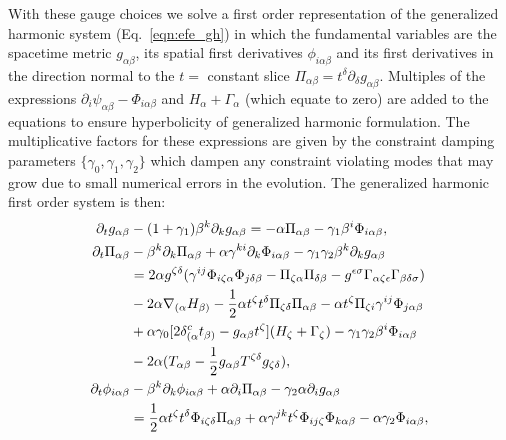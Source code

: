 With these gauge choices we solve a first order representation of the generalized harmonic system (Eq.~\ref{eqn:efe_gh}) in which the fundamental variables are the spacetime metric $ g_{\alpha\beta}$, its spatial first derivatives $\phi_{i\alpha\beta}$ and its first derivatives in the direction normal to the $t=$ constant slice $\Pi_{\alpha\beta} = t^\delta\partial_\delta g_{\alpha\beta}$. Multiples of the expressions $\partial_i\psi_{\alpha\beta} - \Phi_{i\alpha\beta}$ and $H_\alpha + \Gamma_\alpha$ (which equate to zero) are added to the equations to ensure hyperbolicity of generalized harmonic formulation. The multiplicative factors for these expressions are given by the constraint damping parameters $\{\gamma_0,\gamma_1,\gamma_2\}$ which dampen any constraint violating modes that may grow due to small numerical errors in the evolution. The generalized harmonic first order system is then:
%
\begin{align}
  \partial_t g_{\alpha\beta} &- (1 + \gamma_1)\beta^k\partial_k g_{\alpha\beta} = -\alpha\Pi_{\alpha\beta} - \gamma_1\beta^i\Phi_{i\alpha\beta},  \\
  \partial_t\Pi_{\alpha\beta} &- \beta^k\partial_k\Pi_{\alpha\beta} + \alpha \gamma^{ki}\partial_k\Phi_{i\alpha\beta} - \gamma_1\gamma_2\beta^k\partial_k g_{\alpha\beta} \\
  &= 2\alpha g^{\zeta\delta}(\gamma^{ij}\Phi_{i\zeta\alpha}\Phi_{j\delta\beta} - \Pi_{\zeta\alpha}\Pi_{\delta\beta} -  g^{\epsilon\sigma}\Gamma_{\alpha\zeta\epsilon}\Gamma_{\beta\delta\sigma}) \notag\\
  &-2\alpha\nabla_{(\alpha}H_{\beta)} - \frac{1}{2}\alpha t^\zeta t^\delta\Pi_{\zeta\delta}\Pi_{\alpha\beta} - \alpha t^\zeta\Pi_{\zeta i}\gamma^{ij}\Phi_{j\alpha\beta} \notag\\
  &+\alpha\gamma_0[2\delta^c_{(\alpha}t_{\beta)} -  g_{\alpha\beta}t^\zeta](H_\zeta + \Gamma_\zeta) - \gamma_1\gamma_2\beta^i\Phi_{i\alpha\beta}\notag\\
    &-2\alpha(T_{\alpha\beta} - \frac{1}{2} g_{\alpha\beta}T^{\zeta\delta} g_{\zeta\delta}),\notag \\
  \partial_t\phi_{i\alpha\beta} &- \beta^k\partial_k\phi_{i\alpha\beta} + \alpha\partial_i\Pi_{\alpha\beta} - \gamma_2\alpha\partial_i g_{\alpha\beta} \\
  & = \frac{1}{2}\alpha t^\zeta t^\delta\Phi_{i\zeta\delta}\Pi_{\alpha\beta} + \alpha\gamma^{jk}t^\zeta\Phi_{ij\zeta}\Phi_{k\alpha\beta} - \alpha\gamma_2\Phi_{i\alpha\beta}\notag,
\end{align}

